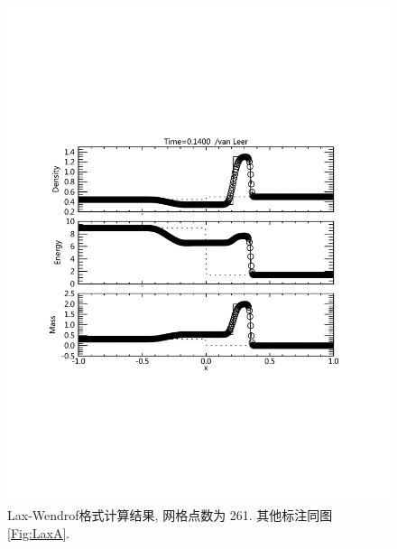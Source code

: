 \documentclass[10.5pt
]{article}
\begin{document}
\begin{figure}
\begin{center}
\includegraphics[width=.85\textwidth]{fig_tvd.pdf}
\caption{Lax-Wendrof格式计算结果, 网格点数为 261. 
其他标注同图\ref{Fig:LaxA}.}\label{Fig:LaxB}
\end{center}
\end{figure}
\end{document}
